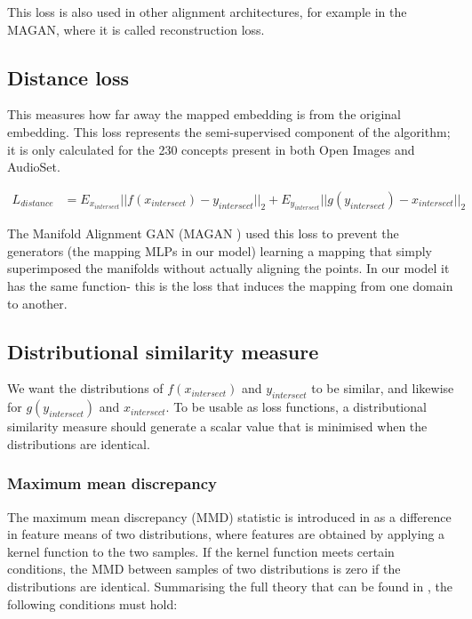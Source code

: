 This loss is also used in other alignment architectures, for example in the MAGAN, \cite{magan} where it is called reconstruction loss. 

\subsection{Distance loss}

This measures how far away the mapped embedding is from the original embedding. This loss represents the semi-supervised component of the algorithm; it is only calculated for the 230 concepts present in both Open Images and AudioSet.

\begin{equation*}
\begin{split}
L_{distance} &= E_{x_{intersect}}||f(x_{intersect}) - y_{intersect}||_2 + E_{y_{intersect}}||g(y_{intersect}) - x_{intersect}||_2
\end{split}
\end{equation*}

The Manifold Alignment GAN (MAGAN \cite{magan}) used this loss to prevent the generators (the mapping MLPs in our model) learning a mapping that simply superimposed the manifolds without actually aligning the points. In our model it has the same function- this is the loss that induces the mapping from one domain to another. 

\subsection{Distributional similarity measure}

We want the distributions of $f(x_{intersect})$ and $y_{intersect}$ to be similar, and likewise for $g(y_{intersect})$ and $x_{intersect}$. To be usable as loss functions, a distributional similarity measure should generate a scalar value that is minimised when the distributions are identical. 

\subsubsection{Maximum mean discrepancy}

The maximum mean discrepancy (MMD) statistic is introduced in \cite{MMDGretton} as a difference in feature means of two distributions, where features are obtained by applying a kernel function to the two samples. If the kernel function meets certain conditions, the MMD between samples of two distributions is zero if the distributions are identical. Summarising the full theory that can be found in \cite{MMDGretton}, the following conditions must hold:

